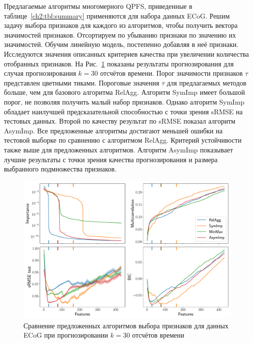 Предлагаемые алгоритмы многомерного QPFS, приведенные в таблице~\ref{ch2:tbl:summary} применяются для набора данных ECoG. 
Решим задачу выбора признаков для каждого из алгоритмов, чтобы получить вектора значимостей признаков. 
Отсортируем по убыванию признаки по значению их значимостей. Обучим линейную модель, постепенно добавляя в неё признаки. 
Исследуются значения описанных критериев качества при увеличении количества отобранных признаков. 
На Рис.~\ref{ch2:fig:ecog_3_30_metrics} показаны результаты прогнозирования для случая прогнозирования $k = 30$ отсчётов времени. 
Порог значимости признаков $\tau$ представлен цветными тиками. 
Пороговые значения $\tau$ для предлагаемых методов больше, чем для базового алгоритма RelAgg. 
Алгоритм SymImp имеет большой порог, не позволяя получить малый набор признаков.
Однако алгоритм SymImp обладает наилучшей предсказательной способностью с точки зрения sRMSE на тестовых данных.
Второй по качеству результат по sRMSE показал алгоритм AsymImp.
Все предложенные алгоритмы достигают меньшей ошибки на тестовой выборке по сравнению с алгоритмом RelAgg. 
Критерий устойчивости также выше для предложенных алгоритмов.
Алгоритм AsymImp показывает лучшие результаты с точки зрения качества прогнозирования и размера выбранного подмножества признаков.

\begin{figure}[ht]
	\includegraphics[width=\linewidth]{figs/ch2/ecog_3_30_metrics}
	\caption{Сравнение предложенных алгоритмов выбора признаков для данных ECoG при прогнозировании $k = 30$ отсчётов времени}
	\label{ch2:fig:ecog_3_30_metrics}
\end{figure}

